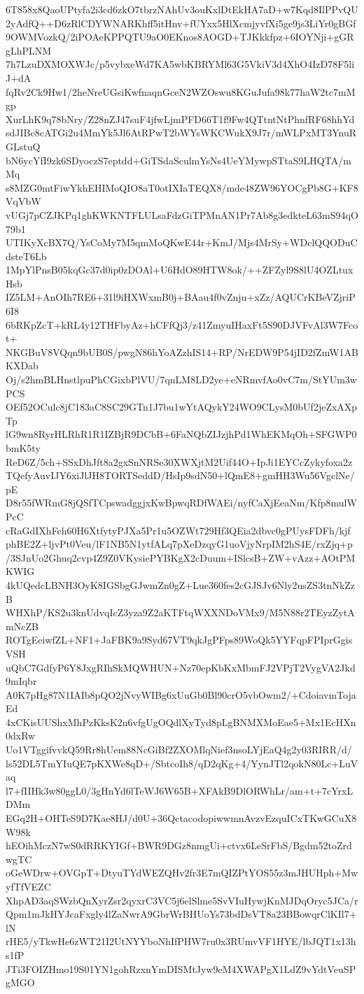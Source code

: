 6T858x8QaoUPtyfa2i3cd6zkO7tbrzNAhUv3ouKxlDtEkHA7aD+w7Kqd8IlPPvQU
2yAdfQ++D6zRlCDYWNARKhff5itHnv+fUYxx5HlXcmjyvfXi5ge9js3LiYr0gBGf
9OWMVozkQ/2iPOAeKPPQTU9aO0EKnos8AOGD+TJKkkfpz+6IOYNji+gGRgLhPLNM
7h7LzuDXMOXWJc/p5vybxeWd7KA5wbKBRYMl63G5VkiV3d4XhO4IzD78F5liJ+dA
fqRv2Ck9Hw1/2heNreUGsiKwfnaqnGceN2WZOswu8KGuJufa98k77haW2tc7mMgp
XurLhK9q78bNry/Z28nZJ47suF4jfwLjmPFD66T1f9Fw4QTtntNtPhnfRF68hhYd
sdJIBc8cATGi2u4MmYk5Jl6AtRPwT2bWYsWKCWukX9J7r/mWLPxMT3YnuRGLstuQ
bN6ycYfI9zk6SDyoczS7eptdd+GiTSdaSculmYsNs4UeYMywpSTtaS9LHQTA/mMq
s8MZG0mtFiwYkhEHIMoQIO8aT0otIXIaTEQX8/mde48ZW96YOCgPb8G+KF8VqVbW
vUGj7pCZJKPq1ghKWKNTFLULsaFdzGiTPMnAN1Pr7Ab8g3edkteL63mS94qO79b1
UTIKyXcBX7Q/YsCoMy7M5qmMoQKwE44r+KmJ/Mjs4MrSy+WDclQQODuCdsteT6Lb
1MpYlPnsB05kqGc37d0ip0zDOAl+U6HdO89HTW8ok/++ZFZyl9S8lU4OZLtuxHsb
IZ5LM+AnOIh7RE6+31l9iHXWxmB0j+BAau4f0vZnju+xZz/AQUCrKBeVZjriP6I8
6bRKpZcT+kRL4y12THFbyAz+hCFfQj3/z41ZmyuIHaxFt5S90DJVFvAl3W7Fcot+
NKGBuV8VQqn9bUB0S/pwgN86hYoAZzhIS14+RP/NrEDW9P54jID2fZmW1ABKXDab
Oj/s2hmBLHnstlpuPhCGixbPlVU/7qnLM8LD2ye+eNRmvfAo0vC7m/StYUm3wPCS
OEf52OCulc8jC183aC8SC29GTn1J7bu1wYtAQykY24WO9CLysM0bUf2jeZxAXpTp
lG9wn8RyrHLRhR1R1IZBjR9DCbB+6FaNQbZIJzjhPd1WhEKMqOh+SFGWP0bmK5ty
ReD6Z/5ch+SSxDhJft8a2gxSnNRSe30XWXjtM2Uif44O+IpJi1EYCcZykyfoxa2z
TQefyAuvIJY6xiJlJH8TORTSeddD/HsIp9sdN50+lQmE8+gmHH3Wu56VgclNe/pE
D8r55fWRmG8jQSfTCpswadggjxKwBpwqRDfWAEi/nyfCaXjEeaNm/Kfp8mulWPcC
cRaGdIXhFeh60H6XtfytyPJXa5Pr1u5OZWt729Hf3QEia2dbvc0gPUysFDFh/kjf
phBE2Z+ljvPt0Veu/lF1NB5N1ytfALq7pXeDzqyG1uoVjyNrpIM2hS4E/rxZjq+p
/3SJnUo2Ghuq2cvp4Z9Z0VKysiePYBKgX2cDuum+ISlcsB+ZW+vAzz+AOtPMKWIG
4kUQedcLBNH3OyK8IGSbgGJwmZn0gZ+Lue360fes2cGJSJv6Nly2usZS3tnNkZzB
WHXhP/KS2u3knUdvqIcZ3yza9Z2aKTFtqWXXNDoVMx9/M5N88r2TEyzZytAmNcZB
ROTgEeiwfZL+NF1+JaFBK9a9Syd67VT9qkJgPFps89WoQk5YYFqpFPIprGgisVSH
uQbC7GdfyP6Y8JxgRIhSkMQWHUN+Nz70epKbKxMbmFJ2VPjT2VygVA2Jkd9mIqbr
A0K7pHg87N1IAIb8pQO2jNvyWIBg6xUuGb0Bl90crO5vbOwm2/+CdoiavmTojaEd
4xCKisUUShxMhPzKksK2n6vfgUgOQdlXyTyd8pLgBNMXMoEae5+Mx1EcHXn0dxRw
Uo1VTggifvvkQ59Rr8hUem88NcGiBf2ZXOMlqNief3nsoLYjEaQ4g2y03RIRR/d/
ls52DL5TmYIuQE7pKXWe8qD+/SbtcoIh8/qD2qKg+4/YynJTl2qokN80Lc+LuVaq
l7+fIIHk3w80ggL0/3gHnYd6lTeWJ6W65B+XFAkB9DlORWhLr/am+t+7cYrxLDMm
EGq2H+OHTeS9D7Kae8HJ/d0U+36QctacodopiwwmnAvzvEzquICxTKwGCuX8W98k
hEOihMczN7wS0dRRKYIGf+BWR9DGz8nmgUi+ctvx6LeSrFbS/Bgdm52toZrdwgTC
oGeWDrw+OVGpT+DtyuTYdWEZQHv2fr3E7mQIZPtYOS55z3mJHUHph+MwyfTfVEZC
XhpAD3aqSWzbQnXyrZsr2qyxrC3VC5j6elSlme5SvVIuHywjKnMJDqOryc5JCa/r
Qpm1mJkHYJcaFxgly4lZaNwrA9GbrWrBHUoYs73bdDsVT8a23BBowqrClKIl7+lN
rHE5/yTkwHe6zWT21I2UtNYYboNhIfPHW7ru0x3RUmvVF1HYE/lbJQT1x13hs1fP
JTi3FOIZHmo19S01YN1gohRzxnYmDISMtJyw9eM4XWAPgX1LdZ9vYdtVeuSPgMGO
